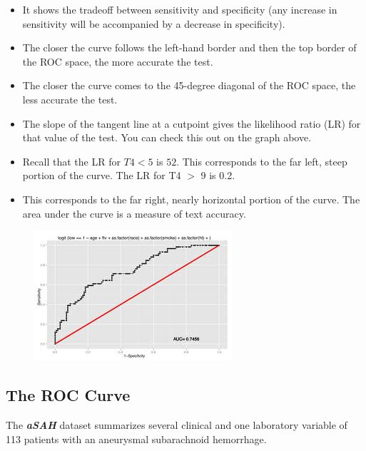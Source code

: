 \documentclass[caret-main.tex]{subfiles}
\begin{document}
\begin{itemize}
\item It shows the tradeoff between sensitivity and specificity (any increase in sensitivity will be accompanied by a decrease in specificity).
\item The closer the curve follows the left-hand border and then the top border of the ROC space, the more accurate the test.
\item The closer the curve comes to the 45-degree diagonal of the ROC space, the less accurate the test.
\item The slope of the tangent line at a cutpoint gives the likelihood ratio (LR) for that value of the test. You can check this out on the graph above. 
\item Recall that the LR for $T4 < 5$ is $52$. This corresponds to the far left, steep portion of the curve. The LR for T4 $>$ 9 is 0.2. 
\item This corresponds to the far right, nearly horizontal portion of the curve.
The area under the curve is a measure of text accuracy.
\end{itemize}


\newpage
\begin{figure}
\centering
\includegraphics[width=0.7\linewidth]{./ROCcurve}
\caption{}
\label{fig:ROCcurve}
\end{figure}


\subsection{The ROC Curve}
The \textbf{\textit{aSAH}} dataset summarizes several clinical and one laboratory variable of 113 patients with an aneurysmal subarachnoid hemorrhage.
\end{document}
